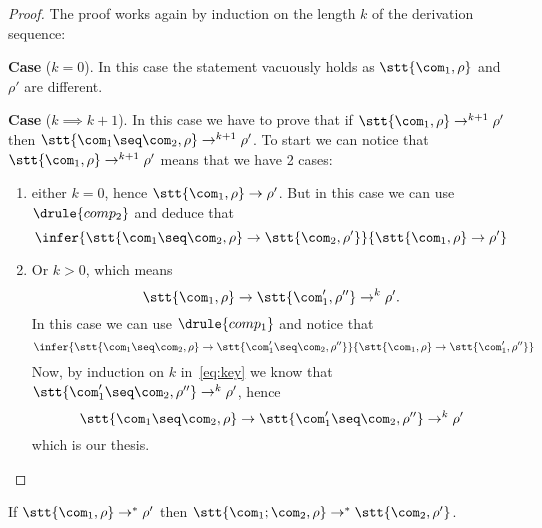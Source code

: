 \begin{proof}
  The proof works again by induction on the length \(k\) of the
  derivation sequence:

  \medskip

  \noindent
  \textbf{Case} (\(k=0\)). In this case the statement vacuously holds
  as \(\stt{\com_1, \rho}\) and \(\rho'\) are different.

  \medskip

  \noindent
  \textbf{Case} (\(k \implies k + 1\)). In this case we have to
  prove that if \(\stt{\com_1, \rho} \to^{k+1} \rho'\) then
  \(\stt{\com_1\seq\com_2, \rho} \to^{k+1} \rho'\). To start we can
  notice that \(\stt{\com_1, \rho} \to^{k+1} \rho'\) means that we
  have 2 cases:
  \begin{enumerate}[label=(\arabic*)]
  \item either \(k = 0\), hence \(\stt{\com_1, \rho} \to \rho'\). But
    in this case we can use \(\drule{comp_2}\) and deduce that
    \begin{equation*}
      \infer{\stt{\com_1\seq\com_2, \rho} \to \stt{\com_2, \rho'}}{\stt{\com_1, \rho} \to \rho'}
    \end{equation*}
    
  \item Or \(k > 0\), which means
    \begin{equation}\label{eq:key}
      \stt{\com_1, \rho} \to \stt{\com_1', \rho''} \to^k \rho'.
    \end{equation}
    In this case we can use \(\drule{comp_1}\) and notice that
    \begin{equation*}
      \infer{\stt{\com_1\seq\com_2, \rho}\to\stt{\com_1'\seq\com_2, \rho''}}{\stt{\com_1, \rho} \to \stt{\com_1', \rho''}}
    \end{equation*}
    Now, by induction on \(k\) in~\eqref{eq:key} we know that
    \(\stt{\com_1'\seq\com_2, \rho''}\to^k\rho'\), hence
    \begin{equation*}
      \stt{\com_1\seq\com_2, \rho} \to \stt{\com_1'\seq\com_2, \rho''} \to^k \rho'
    \end{equation*}
    which is our thesis.
  \end{enumerate}
\end{proof}

\begin{corollary}\label{co:comp}
  If \(\stt{\com_1, \rho} \to^* \rho'\) then
  \(\stt{\com_1;\com_2, \rho}\to^* \stt{\com_2, \rho'}\).
\end{corollary}

